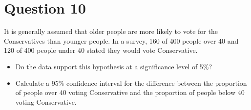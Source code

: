 \documentclass[a4paper,12pt]{article}
\begin{document}
\section*{Question 10}
It is generally assumed that older people are more likely to vote for the Conservatives than younger people. In a survey, 160 of 400 people over 40 and 120 of 400 people under 40 stated they would vote Conservative. 
\begin{itemize}
\item  Do the data support this hypothesis at a significance level of 5\%?
\item  Calculate a 95\% confidence interval for the difference between the proportion of people over 40 voting Conservative and the proportion of people below 40 voting Conservative. 
\end{itemize}
\end{document}
